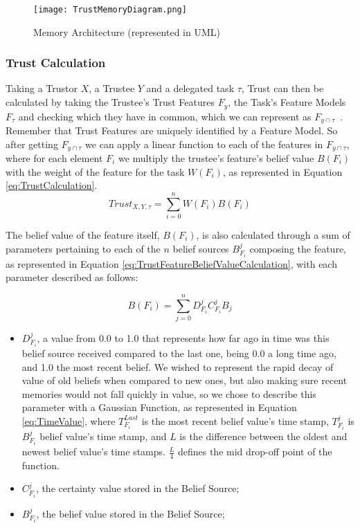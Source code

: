 \begin{figure}[hbt]
    \centering
    \texttt{[image: TrustMemoryDiagram.png]}
    \caption{Memory Architecture (represented in UML)}
    \label{fig:MemoryArchitecture}
\end{figure}


\subsubsection{Trust Calculation}
\label{subsubsec:Trust Calculation}
Taking a Trustor $X$, a Trustee $Y$ and a delegated task $\tau$, Trust can then be calculated by taking the Trustee's Trust Features $F_y$, the Task's Feature Models $F_\tau$ and checking which they have in common, which we can represent as $F_{y\cap\tau}$~. Remember that Trust Features are uniquely identified by a Feature Model. So after getting $F_{y\cap\tau}$ we can apply a linear function to each of the features in $F_{y\cap\tau}$, where for each element $F_i$ we multiply the trustee's feature's belief value $B(F_i)$ with the weight of the feature for the task $W(F_i)$, as represented in Equation \ref{eq:TrustCalculation}.
\begin{equation}
    Trust_{X,Y,\tau}=\sum_{i=0}^{n}W(F_i) B(F_i)
    \label{eq:TrustCalculation}
\end{equation}

The belief value of the feature itself, $B(F_i)$, is also calculated through a sum of parameters pertaining to each of the $n$ belief sources $B_{F_i}^j$ composing the feature, as represented in Equation \ref{eq:TrustFeatureBeliefValueCalculation}, with each parameter described as follows: 

\begin{equation}
B(F_i) = \sum_{j=0}^{n} D^j_{F_i} C^j_{F_i} B_j 
\label{eq:TrustFeatureBeliefValueCalculation}
\end{equation}

\begin{itemize}
    \item $D^j_{F_i}$, a value from 0.0 to 1.0 that represents how far ago in time was this belief source received compared to the last one, being 0.0 a long time ago, and 1.0 the most recent belief. We wished to represent the rapid decay of value of old beliefs when compared to new ones, but also making sure recent memories would not fall quickly in value, so we chose to describe this parameter with a Gaussian Function, as represented in Equation \ref{eq:TimeValue}, where $T^{Last}_{F_i}$ is the most recent belief value's time stamp, $T^j_{F_i}$ is $B_{F_i}^j$ belief value's time stamp, and $L$ is the difference between the oldest and newest belief value's time stamps. $\frac{L}{4}$ defines the mid drop-off point of the function.
    \item $C^j_{F_i}$, the certainty value stored in the Belief Source;
    \item $B^j_{F_i}$, the belief value stored in the Belief Source;
\end{itemize}

